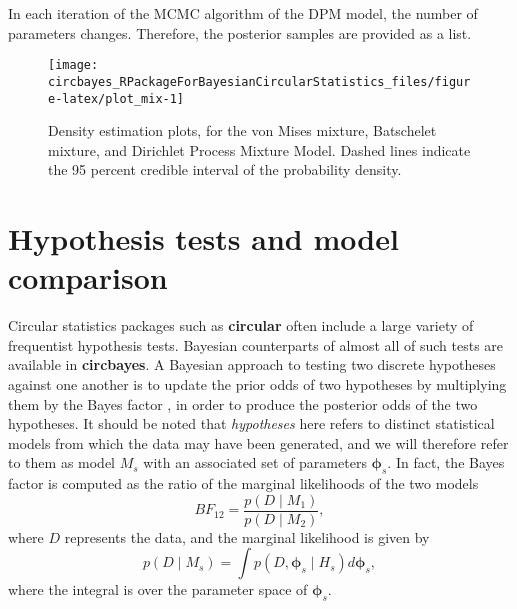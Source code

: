 \documentclass{article}
\newcommand{\pkg}[1]{\textbf{#1}}
\newenvironment{CodeChunk}{}{}
\begin{document}
In each iteration of the MCMC algorithm of the DPM model, the number of
parameters changes. Therefore, the posterior samples are provided as a
list.

\begin{CodeChunk}
	\begin{figure}
		
		{\centering \texttt{[image: circbayes\_RPackageForBayesianCircularStatistics\_files/figure-latex/plot\_mix-1]} 
			
		}
		
		\caption[Density estimation plots, for the von Mises mixture, Batschelet mixture, and Dirichlet Process Mixture Model]{Density estimation plots, for the von Mises mixture, Batschelet mixture, and Dirichlet Process Mixture Model. Dashed lines indicate the 95 percent credible interval of the probability density.}\label{fig:plot_mix}
	\end{figure}
\end{CodeChunk}

\hypertarget{hypothesis-tests-and-model-comparison}{%
	\section{Hypothesis tests and model
		comparison}\label{hypothesis-tests-and-model-comparison}}

\label{hyptest}

Circular statistics packages such as \pkg{circular} often include a
large variety of frequentist hypothesis tests. Bayesian counterparts of
almost all of such tests are available in \pkg{circbayes}. A Bayesian
approach to testing two discrete hypotheses against one another is to
update the prior odds of two hypotheses by multiplying them by the Bayes
factor \citep{kass1995bayes, jeffreys1961theory}, in order to produce
the posterior odds of the two hypotheses. It should be noted that
\textit{hypotheses} here refers to distinct statistical models from
which the data may have been generated, and we will therefore refer to
them as model \(M_s\) with an associated set of parameters
\(\boldsymbol{\phi}_s\). In fact, the Bayes factor is computed as the
ratio of the marginal likelihoods of the two models \begin{equation}
BF_{12} = \frac{p(D \mid M_1)}{p(D \mid M_2)},
\end{equation} where \(D\) represents the data, and the marginal
likelihood is given by \begin{equation} \label{eqn:marglik}
p(D \mid M_s) = \int p(D, \boldsymbol{\phi}_s \mid H_s) d \boldsymbol{\phi}_s,
\end{equation} where the integral is over the parameter space of
\(\boldsymbol{\phi}_s.\)
\end{document}
